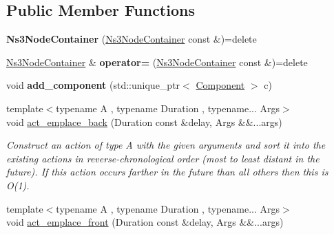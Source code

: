\subsection*{Public Member Functions}
\begin{DoxyCompactItemize}
\item 
\hypertarget{classsma_1_1Ns3NodeContainer_a7d448aa3a6289e5d1f73beb8982f60e3}{{\bfseries Ns3\-Node\-Container} (\hyperlink{classsma_1_1Ns3NodeContainer}{Ns3\-Node\-Container} const \&)=delete}\label{classsma_1_1Ns3NodeContainer_a7d448aa3a6289e5d1f73beb8982f60e3}

\item 
\hypertarget{classsma_1_1Ns3NodeContainer_a959f4a15ef1b756bf9cb82ecc54d9cf2}{\hyperlink{classsma_1_1Ns3NodeContainer}{Ns3\-Node\-Container} \& {\bfseries operator=} (\hyperlink{classsma_1_1Ns3NodeContainer}{Ns3\-Node\-Container} const \&)=delete}\label{classsma_1_1Ns3NodeContainer_a959f4a15ef1b756bf9cb82ecc54d9cf2}

\item 
\hypertarget{classsma_1_1Ns3NodeContainer_a62b15de00156c17973fbcb8bdbf55509}{void {\bfseries add\-\_\-component} (std\-::unique\-\_\-ptr$<$ \hyperlink{classsma_1_1Component}{Component} $>$ c)}\label{classsma_1_1Ns3NodeContainer_a62b15de00156c17973fbcb8bdbf55509}

\item 
\hypertarget{classsma_1_1Ns3NodeContainer_a34e264662e39424402ef9011d108aca2}{{\footnotesize template$<$typename A , typename Duration , typename... Args$>$ }\\void \hyperlink{classsma_1_1Ns3NodeContainer_a34e264662e39424402ef9011d108aca2}{act\-\_\-emplace\-\_\-back} (Duration const \&delay, Args \&\&...args)}\label{classsma_1_1Ns3NodeContainer_a34e264662e39424402ef9011d108aca2}

\begin{DoxyCompactList}\small\item\em Construct an action of type A with the given arguments and sort it into the existing actions in reverse-\/chronological order (most to least distant in the future). If this action occurs farther in the future than all others then this is O(1). \end{DoxyCompactList}\item 
\hypertarget{classsma_1_1Ns3NodeContainer_a90dea220baa998cdb45030fe4617cfec}{{\footnotesize template$<$typename A , typename Duration , typename... Args$>$ }\\void \hyperlink{classsma_1_1Ns3NodeContainer_a90dea220baa998cdb45030fe4617cfec}{act\-\_\-emplace\-\_\-front} (Duration const \&delay, Args \&\&...args)}\label{classsma_1_1Ns3NodeContainer_a90dea220baa998cdb45030fe4617cfec}


\end{DoxyCompactItemize}
